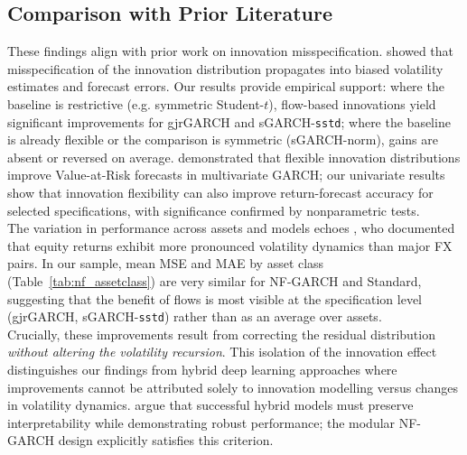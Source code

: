 \documentclass[oneside,12pt]{CUEDthesisPSnPDF}
\newcommand{\textcite}{\citet}
\newcommand{\parencite}{\citep}
\begin{document}
\subsection{Comparison with Prior Literature}
\noindent
These findings align with prior work on innovation misspecification. \textcite{hansen1994autoregressive} showed that misspecification of the innovation distribution propagates into biased volatility estimates and forecast errors. Our results provide empirical support: where the baseline is restrictive (e.g. symmetric Student-$t$), flow-based innovations yield significant improvements for gjrGARCH and sGARCH-\texttt{sstd}; where the baseline is already flexible or the comparison is symmetric (sGARCH-norm), gains are absent or reversed on average. \textcite{bauwens2006multivariate} demonstrated that flexible innovation distributions improve Value-at-Risk forecasts in multivariate GARCH; our univariate results show that innovation flexibility can also improve return-forecast accuracy for selected specifications, with significance confirmed by nonparametric tests.\\

The variation in performance across assets and models echoes \textcite{andersen2001distribution}, who documented that equity returns exhibit more pronounced volatility dynamics than major FX pairs. In our sample, mean MSE and MAE by asset class (Table~\ref{tab:nf_assetclass}) are very similar for NF-GARCH and Standard, suggesting that the benefit of flows is most visible at the specification level (gjrGARCH, sGARCH-\texttt{sstd}) rather than as an average over assets.\\

Crucially, these improvements result from correcting the residual distribution \emph{without altering the volatility recursion}. This isolation of the innovation effect distinguishes our findings from hybrid deep learning approaches \parencite{bao2017deep, kim2018forecasting} where improvements cannot be attributed solely to innovation modelling versus changes in volatility dynamics. \textcite{harvey2022machine} argue that successful hybrid models must preserve interpretability while demonstrating robust performance; the modular NF-GARCH design explicitly satisfies this criterion.\\
\end{document}
